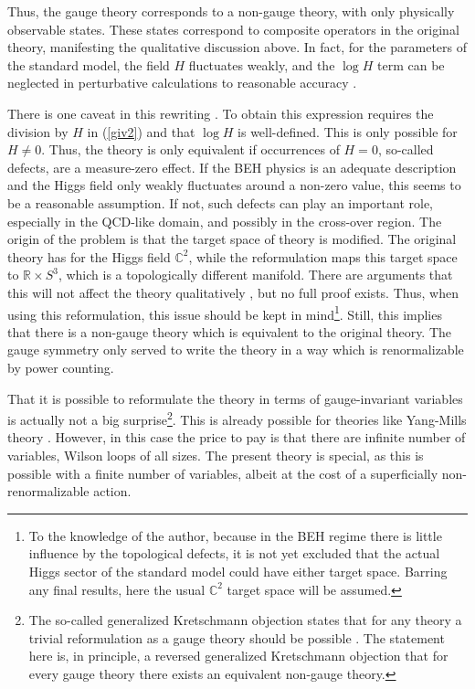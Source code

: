 \documentclass[final,12pt]{article}
\newcommand*{\pref}[1]{(\ref{#1})}
\newcommand*{\1}{1\!\!\!\bot}
\newcommand*{\rn}{\mathbb{R}}
\newcommand*{\cn}{\mathbb{C}}
\begin{document}
Thus, the gauge theory corresponds to a non-gauge theory, with only physically observable states. These states correspond to composite operators in the original theory, manifesting the qualitative discussion above. In fact, for the parameters of the standard model, the field $H$ fluctuates weakly, and the $\log H$ term can be neglected in perturbative calculations to reasonable accuracy \cite{Philipsen:1996af}.

There is one caveat in this rewriting \cite{Maas:2013aia}. To obtain this expression requires the division by $H$ in \pref{giv2} and that $\log H$ is well-defined. This is only possible for $H\neq 0$. Thus, the theory is only equivalent if occurrences of $H=0$, so-called defects, are a measure-zero effect. If the BEH physics is an adequate description and the Higgs field only weakly fluctuates around a non-zero value, this seems to be a reasonable assumption. If not, such defects can play an important role, especially in the QCD-like domain, and possibly in the cross-over region. The origin of the problem is that the target space of theory is modified. The original theory has for the Higgs field $\cn^2$, while the reformulation maps this target space to $\rn\times S^3$, which is a topologically different manifold. There are arguments that this will not affect the theory qualitatively  \cite{Callaway:1988ya,Kenna:1993fp,Fernandez:1992jh}, but no full proof exists. Thus, when using this reformulation, this issue should be kept in mind\footnote{To the knowledge of the author, because in the BEH regime there is little influence by the topological defects, it is not yet excluded that the actual Higgs sector of the standard model could have either target space. Barring any final results, here the usual $\cn^2$ target space will be assumed.}. Still, this implies that there is a non-gauge theory which is equivalent to the original theory. The gauge symmetry only served to write the theory in a way which is renormalizable by power counting.

That it is possible to reformulate the theory in terms of gauge-invariant variables is actually not a big surprise\footnote{The so-called generalized Kretschmann objection states that for any theory a trivial reformulation as a gauge theory should be possible \cite{Francois:2017aa}. The statement here is, in principle, a reversed generalized Kretschmann objection that for every gauge theory there exists an equivalent non-gauge theory.}. This is already possible for theories like Yang-Mills theory \cite{Gambini:1996ik}. However, in this case the price to pay is that there are infinite number of variables, Wilson loops \cite{Gattringer:2010zz} of all sizes. The present theory is special, as this is possible with a finite number of variables, albeit at the cost of a superficially non-renormalizable action.
\end{document}
